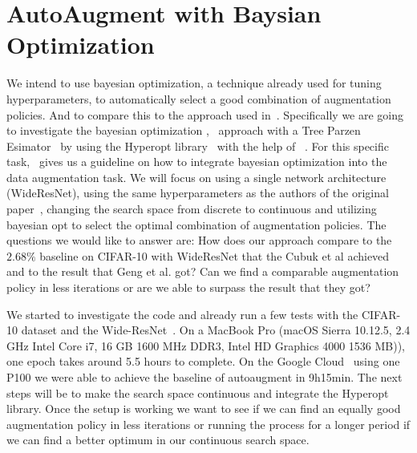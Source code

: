 \documentclass[10pt,twocolumn,letterpaper]{article}
\begin{document}
\section{AutoAugment with Baysian Optimization}

We intend to use bayesian optimization, a technique already used for tuning hyperparameters, to automatically select a good combination of augmentation policies. And to compare this to the approach used in~\cite{Ekin}.
Specifically we are going to investigate the bayesian optimization \cite{2018arXiv180702811F},~\cite{Goodfellow-et-al-2016} approach with a Tree Parzen Esimator~\cite{Kaggle_AMT} by using the Hyperopt library~\cite{HyperOpt} with the help of~\cite{BO_Hyperopt} . For this specific task,~\cite{2017arXiv171010564T} gives us a guideline on how to integrate bayesian optimization into the data augmentation task.
We will focus on using a single network architecture (WideResNet), using the same hyperparameters as the authors of the original paper~\cite{Ekin}, changing the search space from discrete to continuous and utilizing bayesian opt to select the optimal combination of augmentation policies. The questions we would like to answer are: How does our approach compare to the $2.68\%$ baseline on CIFAR-10 with WideResNet that the Cubuk et al achieved and to the result that Geng et al. got? Can we find a comparable augmentation policy in less iterations or are we able to surpass the result that they got?

We started to investigate the code and already run a few tests with the CIFAR-10 dataset and the Wide-ResNet~\cite{Ekin}. On a MacBook Pro (macOS Sierra 10.12.5, 2.4 GHz Intel Core i7, 16 GB 1600 MHz DDR3, Intel HD Graphics 4000 1536 MB)), one epoch takes around 5.5 hours to complete. On the Google Cloud~\cite{GCloud} using one P100 we were able to achieve the baseline of autoaugment in 9h15min.
The next steps will be to make the search space continuous and integrate the Hyperopt library. Once the setup is working we want to see if we can find an equally good augmentation policy in less iterations or running the process for a longer period if we can find a better optimum in our continuous search space.





{\small


}
\end{document}
